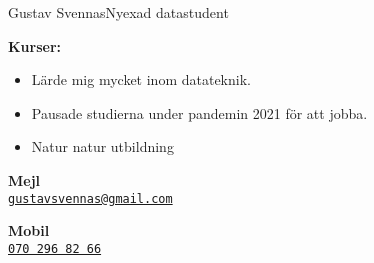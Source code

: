 \documentclass{article}
\begin{document}
\begin{cv}[avatar]{Gustav Svennas}{Nyexad datastudent}
\begin{cvevent}[2018][2023]
    \textbf{Kurser:}
    \begin{itemize}
        \item Lärde mig mycket inom datateknik.
        \item Pausade studierna under pandemin 2021 för att jobba.
    \end{itemize}
\end{cvevent}

\begin{cvevent}[2012][2015]
    \begin{itemize}
        \item Natur natur utbildning
    \end{itemize}
\end{cvevent}


\begin{cvevent}[2017][2020]
\end{cvevent}

\begin{cvevent}[2009][2014]
\end{cvevent}


\cvsidebar %



\begin{cvitem}[Envelope][4]
    \textbf{Mejl}\\
    \href{mailto:gustavsvennas@gmail.com}{\texttt{gustavsvennas@gmail.com}}
\end{cvitem}

\cvseparator[3]
\begin{cvitem}[Phone][4]
    \textbf{Mobil}\\
    \href{tel:+46702968266}{\texttt{070 296 82 66}}
\end{cvitem}


\end{cv}
\end{document}
